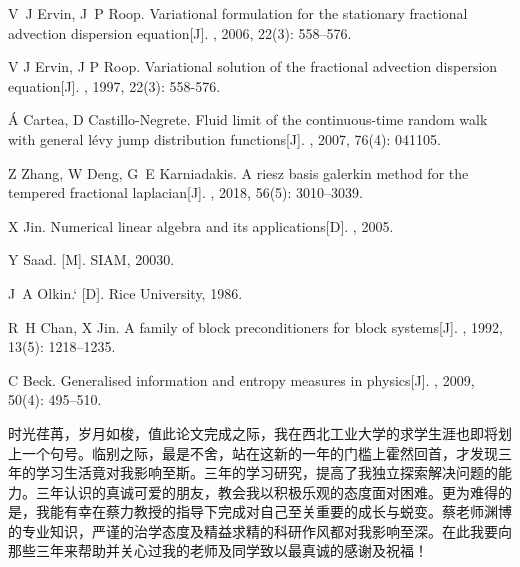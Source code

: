 \documentclass[twoside,UTF8]{nputhesis}
\begin{document}
\begin{thebibliography}{99}
	V~J Ervin, J~P Roop.
	\newblock Variational formulation for the stationary fractional advection
	dispersion equation[J].
	, 2006, 22(3): 558--576.
	
	V J  Ervin, J P Roop.
	\newblock Variational solution of the fractional advection dispersion
	equation[J].
	, 1997, 22(3): 558-576.
	
	
	{\'A} Cartea, D Castillo-Negrete.
	\newblock Fluid limit of the continuous-time random walk with general l{\'e}vy
	jump distribution functions[J].
	, 2007, 76(4): 041105.
	
	Z Zhang, W Deng, G~E Karniadakis.
	\newblock A riesz basis galerkin method for the tempered fractional laplacian[J].
	, 2018, 56(5): 3010--3039.
	
	X Jin.
	\newblock Numerical linear algebra and its applications[D].
	, 2005.
	
	
	Y Saad.
	.
	\newblock SIAM, 20030.
	
	J~A Olkin.`
	.
	\newblock Rice University, 1986.
	
	R~H Chan, X Jin.
	\newblock A family of block preconditioners for block systems[J].
	, 1992, 13(5): 1218--1235.
	
	C Beck.
	\newblock Generalised information and entropy measures in physics[J].
	, 2009, 50(4): 495--510.
	
	
	
	
\end{thebibliography}





\backmatter

%

 
 
\Thanks

时光荏苒，岁月如梭，值此论文完成之际，我在西北工业大学的求学生涯也即将划上一个句号。临别之际，最是不舍，站在这新的一年的门槛上霍然回首，才发现三年的学习生活竟对我影响至斯。三年的学习研究，提高了我独立探索解决问题的能力。三年认识的真诚可爱的朋友，教会我以积极乐观的态度面对困难。更为难得的是，我能有幸在蔡力教授的指导下完成对自己至关重要的成长与蜕变。蔡老师渊博的专业知识，严谨的治学态度及精益求精的科研作风都对我影响至深。在此我要向那些三年来帮助并关心过我的老师及同学致以最真诚的感谢及祝福！
\end{document}

